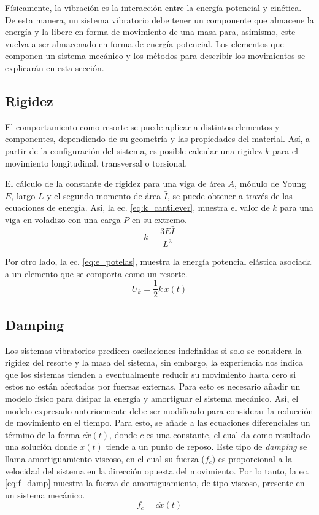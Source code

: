 Físicamente, la vibración es la interacción entre la energía potencial y cinética. De esta manera, un sistema vibratorio debe tener un componente que almacene la energía y la libere en forma de movimiento de una masa para, asimismo, este vuelva a ser almacenado en forma de energía potencial. Los elementos que componen un sistema mecánico y los métodos para describir los movimientos se explicarán en esta sección.


\subsection{Rigidez}
El comportamiento como resorte se puede aplicar a distintos elementos y componentes, dependiendo de su geometría y las propiedades del material. Así, a partir de la configuración del sistema, es posible calcular una rigidez $k$ para el movimiento longitudinal, transversal o torsional. 

El cálculo de la constante de rigidez para una viga de área $A$, módulo de Young $E$, largo $L$ y el segundo momento de área $\bar{I}$, se puede obtener a través de las ecuaciones de energía. Así, la ec. \ref{eq:k_cantilever}, muestra el valor de $k$ para una viga en voladizo con una carga $P$ en su extremo.
\begin{equation}\label{eq:k_cantilever}
	k = \frac{3E\bar{I}}{L^3}
\end{equation}

Por otro lado, la ec. \ref{eq:e_potelas}, muestra la energía potencial elástica asociada a un elemento que se comporta como un resorte.
\begin{equation}\label{eq:e_potelas}
	U_k = \frac{1}{2}k\,x(t)
\end{equation}


\subsection{Damping}
\label{sec:damping}
Los sistemas vibratorios predicen oscilaciones indefinidas si solo se considera la rigidez del resorte y la masa del sistema, sin embargo, la experiencia nos indica que los sistemas tienden a eventualmente reducir su movimiento hasta cero si estos no están afectados por fuerzas externas. Para esto es necesario añadir un modelo físico para disipar la energía y amortiguar el sistema mecánico. Así, el modelo expresado anteriormente debe ser modificado para considerar la reducción de movimiento en el tiempo. Para esto, se añade a las ecuaciones diferenciales un término de la forma $c\dot{x}(t)$, donde $c$ es una constante, el cual da como resultado una solución donde $x(t)$ tiende a un punto de reposo. Este tipo de \textit{damping} se llama amortiguamiento viscoso, en el cual su fuerza ($f_c$) es proporcional a la velocidad del sistema en la dirección opuesta del movimiento. Por lo tanto, la ec. \ref{eq:f_damp} muestra la fuerza de amortiguamiento, de tipo viscoso, presente en un sistema mecánico.
\begin{equation}\label{eq:f_damp}
	f_c = c\dot{x}(t)
\end{equation}

